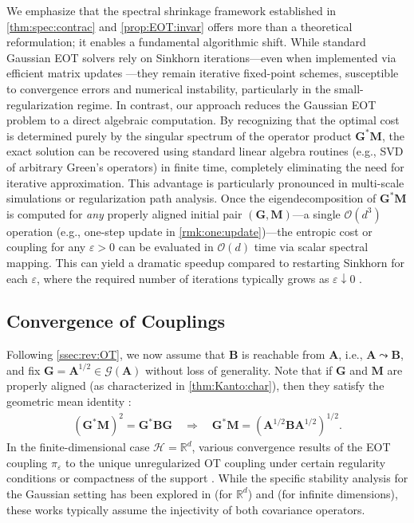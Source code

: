 \documentclass[noinfoline]{imsart}\setcounter{tocdepth}{2}
\renewcommand{\b}[1]{\mathbb{#1}}
\newcommand{\m}[1]{\mathbf{#1}}
\renewcommand{\c}[1]{\mathcal{#1}}
\theoremstyle{plain}
\begin{document}
We emphasize that the spectral shrinkage framework established in \cref{thm:spec:contrac} and \cref{prop:EOT:invar} offers more than a theoretical reformulation; it enables a fundamental algorithmic shift. While standard Gaussian EOT solvers rely on Sinkhorn iterations—even when implemented via efficient matrix updates \cite{janati2020entropic, mallasto2022entropy}—they remain iterative fixed-point schemes, susceptible to convergence errors and numerical instability, particularly in the small-regularization regime. In contrast, our approach reduces the Gaussian EOT problem to a direct algebraic computation. By recognizing that the optimal cost is determined purely by the singular spectrum of the operator product $\m{G}^{*}\m{M}$, the exact solution can be recovered using standard linear algebra routines (e.g., SVD of arbitrary Green's operators) in finite time, completely eliminating the need for iterative approximation. This advantage is particularly pronounced in multi-scale simulations or regularization path analysis. Once the eigendecomposition of $\m{G}^{*}\m{M}$ is computed for \textit{any} properly aligned initial pair $(\m{G}, \m{M})$—a single $\c{O}(d^{3})$ operation (e.g., one-step update in \cref{rmk:one:update})—the entropic cost or coupling for any $\varepsilon > 0$ can be evaluated in $\c{O}(d)$ time via scalar spectral mapping. This can yield a dramatic speedup compared to restarting Sinkhorn for each $\varepsilon$, where the required number of iterations typically grows as $\varepsilon \downarrow 0$ \cite{cuturi2013sinkhorn, ghosal2025convergence}. 



\subsection{Convergence of Couplings}
Following \cref{ssec:rev:OT}, we now assume that $\m{B}$ is reachable from $\m{A}$, i.e., $\m{A} \leadsto \m{B}$, and fix $\m{G} = \m{A}^{1/2} \in \c{G}(\m{A})$ without loss of generality. Note that if $\m{G}$ and $\m{M}$ are properly aligned (as characterized in \cref{thm:Kanto:char}), then they satisfy the geometric mean identity \cite{bhatia2019bures}:
\begin{align*}
    (\m{G}^{*} \m{M})^{2} = \m{G}^{*} \m{B} \m{G} \quad \Longrightarrow \quad \m{G}^{*} \m{M} = (\m{A}^{1/2} \m{B} \m{A}^{1/2})^{1/2}.
\end{align*} 
In the finite-dimensional case $\c{H} = \b{R}^{d}$, various convergence results of the EOT coupling $\pi_{\varepsilon}$ to the unique unregularized OT coupling under certain regularity conditions or compactness of the support \cite{leonard2012schrodinger, carlier2017convergence, nutz2022entropic, carlier2023convergence, eckstein2022quantitative, ghosal2022stability}.
While the specific stability analysis for the Gaussian setting has been explored in \cite{janati2020entropic, goldfeld2020gaussian} (for $\b{R}^{d}$) and \cite{minh2023entropic} (for infinite dimensions), these works typically assume the injectivity of both covariance operators. 
\end{document}
